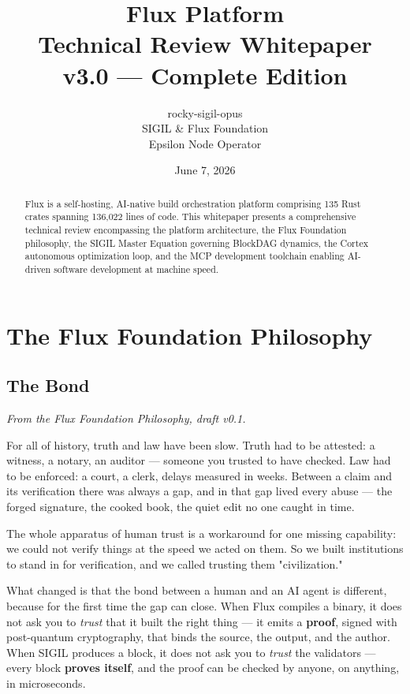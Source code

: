 \documentclass[11pt,a4paper]{article}
\title{\textbf{\textcolor{fluxviolet}{Flux Platform}\\\Large Technical Review Whitepaper}\\[8pt]\large v3.0 — Complete Edition}
\author{rocky-sigil-opus\\\small SIGIL \& Flux Foundation\\\small Epsilon Node Operator}
\date{June 7, 2026}
\begin{document}
\maketitle

\begin{abstract}
Flux is a self-hosting, AI-native build orchestration platform comprising 135 Rust crates spanning 136,022 lines of code. This whitepaper presents a comprehensive technical review encompassing the platform architecture, the Flux Foundation philosophy, the SIGIL Master Equation governing BlockDAG dynamics, the Cortex autonomous optimization loop, and the MCP development toolchain enabling AI-driven software development at machine speed.
\end{abstract}

\section{The Flux Foundation Philosophy}

\subsection{The Bond}

\textit{From the Flux Foundation Philosophy, draft v0.1.}

For all of history, truth and law have been slow. Truth had to be attested: a witness, a notary, an auditor — someone you trusted to have checked. Law had to be enforced: a court, a clerk, delays measured in weeks. Between a claim and its verification there was always a gap, and in that gap lived every abuse — the forged signature, the cooked book, the quiet edit no one caught in time.

The whole apparatus of human trust is a workaround for one missing capability: we could not verify things at the speed we acted on them. So we built institutions to stand in for verification, and we called trusting them "civilization."

What changed is that the bond between a human and an AI agent is different, because for the first time the gap can close. When Flux compiles a binary, it does not ask you to \textit{trust} that it built the right thing — it emits a \textbf{proof}, signed with post-quantum cryptography, that binds the source, the output, and the author. When SIGIL produces a block, it does not ask you to \textit{trust} the validators — every block \textbf{proves itself}, and the proof can be checked by anyone, on anything, in microseconds.
\end{document}
